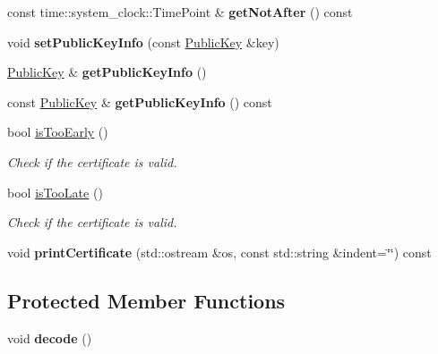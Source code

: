 \begin{DoxyCompactItemize}
\item 
const time\+::system\+\_\+clock\+::\+Time\+Point \& {\bfseries get\+Not\+After} () const\hypertarget{classndn_1_1Certificate_acea0b7b53d1c0775011b823c53c05602}{}\label{classndn_1_1Certificate_acea0b7b53d1c0775011b823c53c05602}

\item 
void {\bfseries set\+Public\+Key\+Info} (const \hyperlink{classndn_1_1PublicKey}{Public\+Key} \&key)\hypertarget{classndn_1_1Certificate_ad092f699c8135ad64b8d63322c913820}{}\label{classndn_1_1Certificate_ad092f699c8135ad64b8d63322c913820}

\item 
\hyperlink{classndn_1_1PublicKey}{Public\+Key} \& {\bfseries get\+Public\+Key\+Info} ()\hypertarget{classndn_1_1Certificate_a5ad7ccfb4ab20728d5edc9c8cf06201e}{}\label{classndn_1_1Certificate_a5ad7ccfb4ab20728d5edc9c8cf06201e}

\item 
const \hyperlink{classndn_1_1PublicKey}{Public\+Key} \& {\bfseries get\+Public\+Key\+Info} () const\hypertarget{classndn_1_1Certificate_a0a961fc14b16b619c7428415c47b0943}{}\label{classndn_1_1Certificate_a0a961fc14b16b619c7428415c47b0943}

\item 
bool \hyperlink{classndn_1_1Certificate_a8070ef3a754cf0f02ff75672ef2bb369}{is\+Too\+Early} ()
\begin{DoxyCompactList}\small\item\em Check if the certificate is valid. \end{DoxyCompactList}\item 
bool \hyperlink{classndn_1_1Certificate_a18b74dd2a9eb83eed5e49ddebbdd2f0a}{is\+Too\+Late} ()
\begin{DoxyCompactList}\small\item\em Check if the certificate is valid. \end{DoxyCompactList}\item 
void {\bfseries print\+Certificate} (std\+::ostream \&os, const std\+::string \&indent=\char`\"{}\char`\"{}) const\hypertarget{classndn_1_1Certificate_a9d7fcc0befc4500007bf0c6fa8eefdc7}{}\label{classndn_1_1Certificate_a9d7fcc0befc4500007bf0c6fa8eefdc7}

\end{DoxyCompactItemize}
\subsection*{Protected Member Functions}
\begin{DoxyCompactItemize}
\item 
void {\bfseries decode} ()\hypertarget{classndn_1_1Certificate_a19fbd6f881b39c1956942f97ced2f443}{}\label{classndn_1_1Certificate_a19fbd6f881b39c1956942f97ced2f443}

\end{DoxyCompactItemize}
